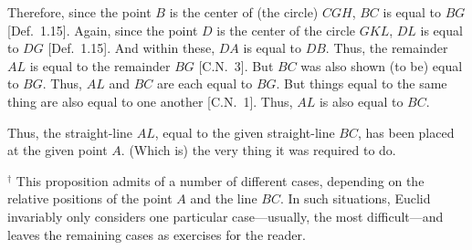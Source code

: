\begin{Parallel}{}{}
{\epsfysize=3in
\centerline{}

Therefore, since the point $B$ is the center of (the circle) $CGH$, $BC$ is equal to 
$BG$ [Def.~1.15]. Again, since the point $D$ is the center of the circle $GKL$, $DL$ is equal to $DG$ [Def.~1.15]. And within these,  $DA$ is equal to $DB$. Thus, the remainder $AL$ is equal to the remainder $BG$ [C.N.~3]. But $BC$ was also shown (to be)  equal to $BG$. Thus,  $AL$
and $BC$ are each equal to $BG$. But things equal to the same thing are also equal to one another [C.N.~1]. Thus, $AL$ is also equal to $BC$.

Thus, the straight-line $AL$, equal to the given straight-line $BC$,
has been placed at the given point $A$. (Which is) the very thing it was required to do.}
\end{Parallel}
{\footnotesize
\noindent $^\dag$ This proposition admits of a number
of different cases, depending on the relative positions of the point $A$
and the line $BC$. In such situations, Euclid invariably only considers one
particular case---usually, the most difficult---and leaves the remaining cases as
exercises for the reader.}

